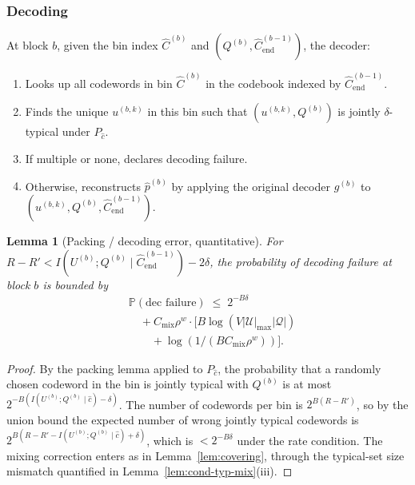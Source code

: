 \documentclass[11pt]{article}
\newcommand{\Prob}{\mathbb{P}}
\newcommand{\Chat}{\hat{C}}
\theoremstyle{plain}
\newtheorem{lemma}[theorem]{Lemma}
\theoremstyle{definition}
\theoremstyle{remark}
\begin{document}
\subsubsection{Decoding}

At block $b$, given the bin index $\Chat^{(b)}$ and
$(Q^{(b)}, \hat C^{(b-1)}_{\mathrm{end}})$, the decoder:
\begin{enumerate}[label=(\arabic*)]
\item Looks up all codewords in bin $\Chat^{(b)}$ in the codebook
indexed by $\hat C^{(b-1)}_{\mathrm{end}}$.
\item Finds the unique $u^{(b,k)}$ in this bin such that
$(u^{(b,k)}, Q^{(b)})$ is jointly $\delta$-typical under $P_{\hat c}$.
\item If multiple or none, declares decoding failure.
\item Otherwise, reconstructs $\hat p^{(b)}$ by applying the original
decoder $g^{(b)}$ to $(u^{(b,k)}, Q^{(b)}, \hat C^{(b-1)}_{\mathrm{end}})$.
\end{enumerate}

\begin{lemma}[Packing / decoding error, quantitative]\label{lem:packing}
For $R - R' < I(U^{(b)}; Q^{(b)} \mid \hat C^{(b-1)}_{\mathrm{end}}) - 2\delta$,
the probability of decoding failure at block $b$ is bounded by
\[
\begin{aligned}
&\Prob(\text{dec failure})
\;\leq\;
2^{-B\delta}\\
&\quad + C_{\mathrm{mix}}\rho^w \cdot \bigl[B\log(V|\mathcal{U}|_{\max}|\mathcal{Q}|)\\
&\qquad + \log(1/(BC_{\mathrm{mix}}\rho^w))\bigr].
\end{aligned}
\]
\end{lemma}

\begin{proof}
By the packing lemma \citep[Lemma 3.1]{elgamal2011network} applied to
$P_{\hat c}$, the probability that a randomly chosen codeword in the
bin is jointly typical with $Q^{(b)}$ is at most
$2^{-B(I(U^{(b)}; Q^{(b)} \mid \hat c) - \delta)}$. The number of
codewords per bin is $2^{B(R - R')}$, so by the union bound the
expected number of wrong jointly typical codewords is
$2^{B(R - R' - I(U^{(b)}; Q^{(b)} \mid \hat c) + \delta)}$, which is
$< 2^{-B\delta}$ under the rate condition. The mixing correction
enters as in Lemma~\ref{lem:covering}, through the typical-set
size mismatch quantified in Lemma~\ref{lem:cond-typ-mix}(iii).
\end{proof}
\end{document}
